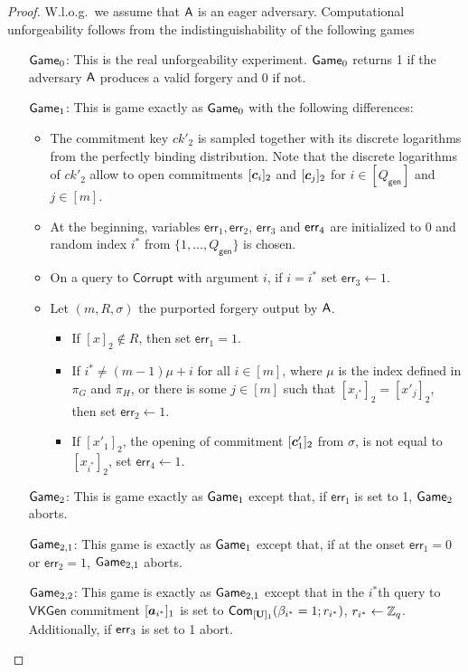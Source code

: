 \begin{proof}
W.l.o.g.~we assume that $\mathsf{A}$ is an eager adversary. Computational unforgeability follows from the indistinguishability of the following games
\begin{itemize}
\item[$\mathsf{Game}_0$:] This is the real unforgeability experiment. $\mathsf{Game}_0$ returns 1 if the adversary $\mathsf{A}$ produces a valid forgery and 0 if not.
\item[$\mathsf{Game}_1$:] This is game exactly as $\mathsf{Game}_0$ with the following differences: 
    \begin{itemize}
    \item The commitment key $ck'_2$ is sampled together with its discrete logarithms from the perfectly binding distribution. Note that the discrete logarithms of $ck'_2$ allow to open commitments $[{\boldsymbol{c}}_i]_2$ and $[{\boldsymbol{c}}_{j}]_2$ for $i\in[Q_\mathsf{gen}]$ and $j\in[m]$.
    \item At the beginning, variables $\mathsf{err}_1,\mathsf{err}_2$, $\mathsf{err}_3$ and $\mathsf{err}_4$ are initialized to $0$ and random index $i^*$ from $\{1,\ldots, Q_\mathsf{gen}\}$ is chosen.
    \item On a query to $\mathsf{Corrupt}$ with argument $i$, if $i=i^*$ set $\mathsf{err}_3\gets 1$.
    \item Let $(m,R,\sigma)$ the purported forgery output by $\mathsf{A}$.
    \begin{itemize}
     	\item If $[x]_2\notin R$, then set $\mathsf{err}_1=1$.
     	\item If $i^* \neq (m-1)\mu + i$ for all $i\in [m]$, where $\mu$ is the index defined in $\pi_G$ and $\pi_H$, or there is some $j\in[m]$ such that $[x_{i^*}]_2 = [x'_j]_2$, then set $\mathsf{err}_2\gets 1$.
     	\item If $[x'_1]_2$, the opening of commitment $[{\boldsymbol{c}}'_1]_2$ from $\sigma$, is not equal to $[x_{i^*}]_2$,  set $\mathsf{err}_4\gets 1$.
     	\end{itemize}
    \end{itemize}
\item[$\mathsf{Game}_2$:] This is game exactly as $\mathsf{Game}_1$ except that, if $\mathsf{err}_1$ is set to 1, $\mathsf{Game}_2$ aborts.
\item[$\mathsf{Game}_{2,1}$:] This game is exactly as $\mathsf{Game}_1$ except that, if at the onset $\mathsf{err}_1=0$ or $\mathsf{err}_2=1$, $\mathsf{Game}_{2,1}$ aborts.
\item[$\mathsf{Game}_{2,2}$:] This game is exactly as $\mathsf{Game}_{2,1}$ except that in the $i^*$th query to $\mathsf{VKGen}$ commitment $[{\boldsymbol{a}}_{i^*}]_1$ is set to $\mathsf{Com}_{[\mathbf{{U}}]_1}(\beta_{i^*}=1;r_{i^*})$, $r_{i^*}\gets\mathbb{Z}_q$. Additionally, if $\mathsf{err}_3$ is set to 1 abort.

\end{itemize}
\end{proof}
